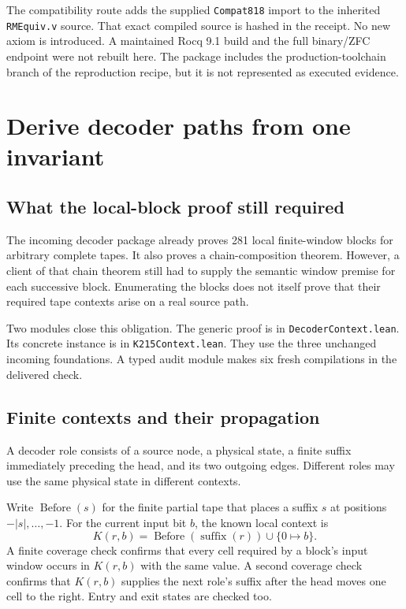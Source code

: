 \documentclass[11pt]{article}
\newcommand{\code}[1]{\texttt{#1}}
\theoremstyle{remark}
\begin{document}
The compatibility route adds the supplied \code{Compat818} import to the
inherited \code{RMEquiv.v} source. That exact compiled source is hashed in
the receipt. No new axiom is introduced. A maintained Rocq 9.1 build and
the full binary/ZFC endpoint were not rebuilt here. The package includes
the production-toolchain branch of the reproduction recipe, but it is not
represented as executed evidence.

\section{Derive decoder paths from one invariant}
\label{sec:decoder}

\subsection{What the local-block proof still required}

The incoming decoder package already proves 281 local finite-window blocks
for arbitrary complete tapes. It also proves a chain-composition theorem.
However, a client of that chain theorem still had to supply the semantic
window premise for each successive block. Enumerating the blocks does not
itself prove that their required tape contexts arise on a real source path.

Two modules close this obligation.
The generic proof is in \code{DecoderContext.lean}.
Its concrete instance is in \code{K215Context.lean}.
They use the three unchanged incoming foundations. A typed audit module
makes six fresh compilations in the delivered check.

\subsection{Finite contexts and their propagation}

A decoder role consists of a source node, a physical state, a finite suffix
immediately preceding the head, and its two outgoing edges. Different
roles may use the same physical state in different contexts.

Write \(\operatorname{Before}(s)\) for the finite partial tape that places
a suffix \(s\) at positions
\(-|s|,\ldots,-1\). For the current input bit \(b\), the known local context is
\[
K(r,b)=\operatorname{Before}(\operatorname{suffix}(r))\cup\{0\mapsto b\}.
\]
A finite coverage check confirms that every cell required by a block's
input window occurs in \(K(r,b)\) with the same value. A second coverage
check confirms that \(K(r,b)\) supplies the next role's suffix after the
head moves one cell to the right. Entry and exit states are checked too.
\end{document}

